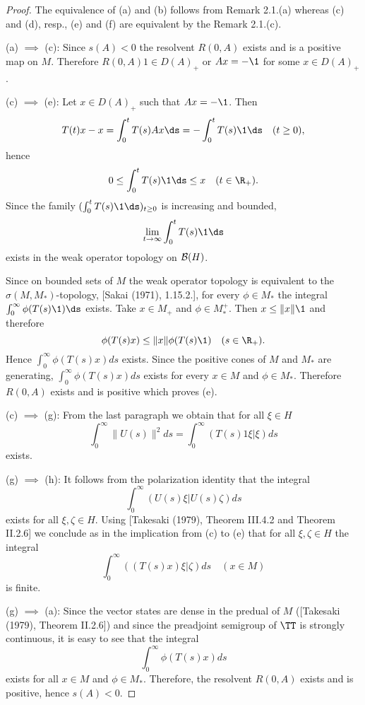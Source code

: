 \begin{proof}
The equivalence of (a) and (b) follows from Remark 2.1.(a) whereas (c) and (d), resp., (e) and (f) are equivalent by the Remark 2.1.(c).

(a) $\implies$ (c): Since $s(A) < 0$ the resolvent $R(0,A)$ exists and is a positive map on $M$.
Therefore $R(0,A)1 \in D(A)_{+}$ or $Ax = -\1$ for some $x \in D(A)_{+}$.

\newpage

(c) $\implies$ (e): Let $x \in D(A)_{+}$ such that $Ax = -\1$.
Then
\[
T(t)x - x = \int_{0}^{t} T(s)Ax \ds = -\int_{0}^{t} T(s) \1 \ds \quad (t \geq 0),
\]
hence
\[
0 \leq \int_{0}^{t} T(s) \1 \ds \leq x \quad (t \in \R_{+}).
\]
Since the family $(\int_{0}^{t} T(s)\1 \ds)_{t \geq 0}$ is increasing and bounded, 
%
\[
	\lim_{t \to \infty} \int_{0}^{t} T(s) \1 \ds
\]
%
exists in the weak operator topology on $\mathcal{B}(H)$.

Since on bounded sets of $M$ the weak operator topology is equivalent to the $\sigma(M,M_{*})$-topology, [Sakai (1971), 1.15.2.], for every $\phi \in M_{*}$ the integral $ \int_{0}^{\infty}\phi(T(s) \1) \ds $ exists.
Take $x \in M_{+}$ and $\phi \in M_{*}^{+}$.
Then $x \leq \|x\| \1$ and therefore
\[
	\phi(T(s)x) \leq \|x\|\phi(T(s) \1) \quad (s \in \R_{+}).
\]
Hence $\int_{0}^{\infty} \phi(T(s)x)ds$ exists.
Since the positive cones of $M$ and $M_{*}$ are generating, $\int_{0}^{\infty}\phi(T(s)x)ds$ exists for every $x \in M$ and $\phi \in M_{*}$.
Therefore $R(0,A)$ exists and is positive which proves (e).

(c) $\implies$ (g): From the last paragraph we obtain that for all $\xi \in H$
\[
\int_{0}^{\infty}\|U(s)\|^2ds = \int_{0}^{\infty}(T(s)1\xi|\xi)ds
\]
exists.

(g) $\implies$ (h): It follows from the polarization identity that the integral
\[
\int_{0}^{\infty}(U(s)\xi|U(s)\zeta)ds
\]
exists for all $\xi,\zeta \in H$.
Using [Takesaki (1979), Theorem III.4.2 and Theorem II.2.6] we conclude as in the implication from (c) to (e) that for all $\xi,\zeta \in H$ the integral
\[
\int_{0}^{\infty}((T(s)x)\xi|\zeta)ds \quad (x \in M)
\]
is finite.

\newpage
(g) $\implies$ (a): Since the vector states are dense in the predual of $M$ ([Takesaki (1979), Theorem II.2.6]) and since the preadjoint semigroup of\/ $\TT$ is strongly continuous, it is easy to see that the integral
\[
\int_{0}^{\infty} \phi(T(s)x)ds
\]
exists for all $x \in M$ and $\phi \in M_{*}$.
Therefore, the resolvent $R(0,A)$ exists and is positive, hence $s(A) < 0$.
\end{proof}

